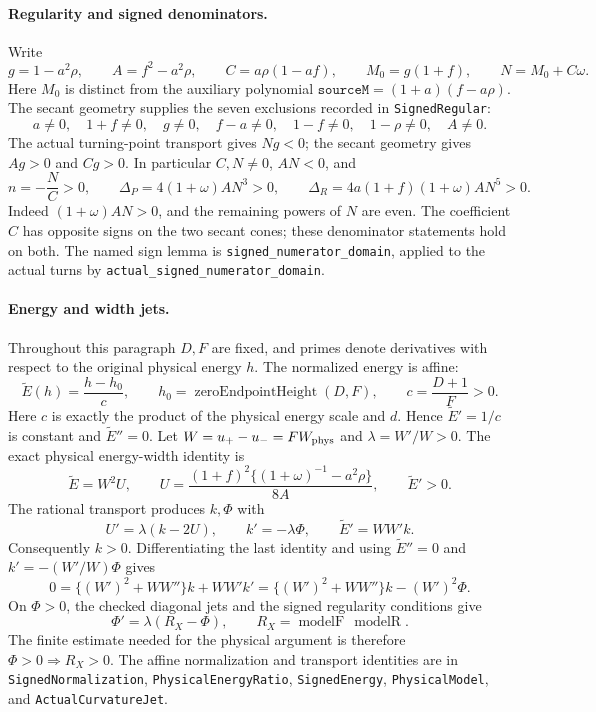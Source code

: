 \paragraph{Regularity and signed denominators.}
Write
\[
 g=1-a^2\rho,\qquad A=f^2-a^2\rho,\qquad
 C=a\rho(1-af),\qquad M_0=g(1+f),\qquad N=M_0+C\omega.
\]
Here $M_0$ is distinct from the auxiliary polynomial
$\texttt{sourceM}=(1+a)(f-a\rho)$. The secant geometry supplies the
seven exclusions recorded in \texttt{SignedRegular}:
\[
 a\ne0,\quad 1+f\ne0,\quad g\ne0,\quad f-a\ne0,\quad
 1-f\ne0,\quad 1-\rho\ne0,\quad A\ne0.
\]
The actual turning-point transport gives $Ng<0$; the secant geometry
gives $Ag>0$ and $Cg>0$. In particular $C,N\ne0$, $AN<0$, and
\[
 n=-\frac NC>0,\qquad
 \Delta_P=4(1+\omega)AN^3>0,\qquad
 \Delta_R=4a(1+f)(1+\omega)AN^5>0.
\]
Indeed $(1+\omega)AN>0$, and the remaining powers of $N$ are even.
The coefficient $C$ has opposite signs on the two secant cones; these
denominator statements hold on both. The named sign lemma is
\texttt{signed\_numerator\_domain}, applied to the actual turns by
\texttt{actual\_signed\_numerator\_domain}.

\paragraph{Energy and width jets.}
Throughout this paragraph $D,F$ are fixed, and primes denote derivatives
with respect to the original physical energy $h$. The normalized energy
is affine:
\[
 \widetilde E(h)=\frac{h-h_0}{c},\qquad
 h_0=\operatorname{zeroEndpointHeight}(D,F),\qquad
 c=\frac{D+1}{F}>0.
\]
Here $c$ is exactly the product of the physical energy scale and $d$.
Hence $\widetilde E'=1/c$ is constant and $\widetilde E''=0$.
Let $W=u_+-u_-=F W_{\rm phys}$ and $\lambda=W'/W>0$.
The exact physical energy-width identity is
\[
 \widetilde E=W^2U,\qquad
 U=\frac{(1+f)^2\{(1+\omega)^{-1}-a^2\rho\}}{8A},
 \qquad \widetilde E'>0.
\]
The rational transport produces $k,\Phi$ with
\[
 U'=\lambda(k-2U),\qquad k'=-\lambda\Phi,\qquad
 \widetilde E'=WW'k.
\]
Consequently $k>0$. Differentiating the last identity and using
$\widetilde E''=0$ and $k'=-(W'/W)\Phi$ gives
\[
 0=\{(W')^2+WW''\}k+WW'k'
  =\{(W')^2+WW''\}k-(W')^2\Phi.
\]
On $\Phi>0$, the checked diagonal jets and the signed regularity
conditions give
\[
 \Phi'=\lambda(R_X-\Phi),\qquad
 R_X=\operatorname{modelF}\,\operatorname{modelR}.
\]
The finite estimate needed for the physical argument is therefore
$\Phi>0\Longrightarrow R_X>0$.
The affine normalization and transport identities are in
\texttt{SignedNormalization}, \texttt{PhysicalEnergyRatio},
\texttt{SignedEnergy}, \texttt{PhysicalModel}, and
\texttt{ActualCurvatureJet}.

